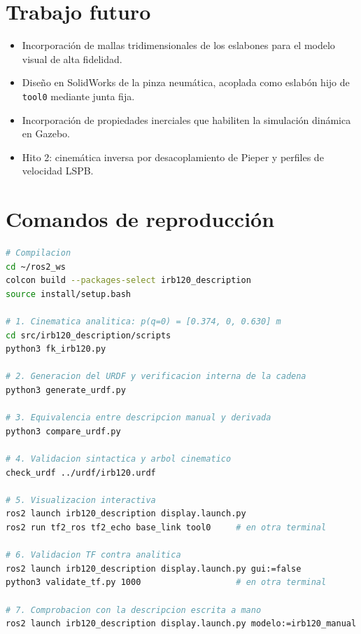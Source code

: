 \documentclass[11pt,a4paper]{article}
\begin{document}
\section{Trabajo futuro}

\begin{itemize}[leftmargin=*]
\item Incorporación de mallas tridimensionales de los eslabones para el
modelo visual de alta fidelidad.
\item Diseño en SolidWorks de la pinza neumática, acoplada como eslabón
hijo de \texttt{tool0} mediante junta fija.
\item Incorporación de propiedades inerciales que habiliten la
simulación dinámica en Gazebo.
\item Hito 2: cinemática inversa por desacoplamiento de Pieper y
perfiles de velocidad LSPB.
\end{itemize}

\appendix
\section{Comandos de reproducción}

\begin{lstlisting}[language=bash,caption={Secuencia completa de
verificación}]
# Compilacion
cd ~/ros2_ws
colcon build --packages-select irb120_description
source install/setup.bash

# 1. Cinematica analitica: p(q=0) = [0.374, 0, 0.630] m
cd src/irb120_description/scripts
python3 fk_irb120.py

# 2. Generacion del URDF y verificacion interna de la cadena
python3 generate_urdf.py

# 3. Equivalencia entre descripcion manual y derivada
python3 compare_urdf.py

# 4. Validacion sintactica y arbol cinematico
check_urdf ../urdf/irb120.urdf

# 5. Visualizacion interactiva
ros2 launch irb120_description display.launch.py
ros2 run tf2_ros tf2_echo base_link tool0     # en otra terminal

# 6. Validacion TF contra analitica
ros2 launch irb120_description display.launch.py gui:=false
python3 validate_tf.py 1000                   # en otra terminal

# 7. Comprobacion con la descripcion escrita a mano
ros2 launch irb120_description display.launch.py modelo:=irb120_manual
\end{lstlisting}
\end{document}
